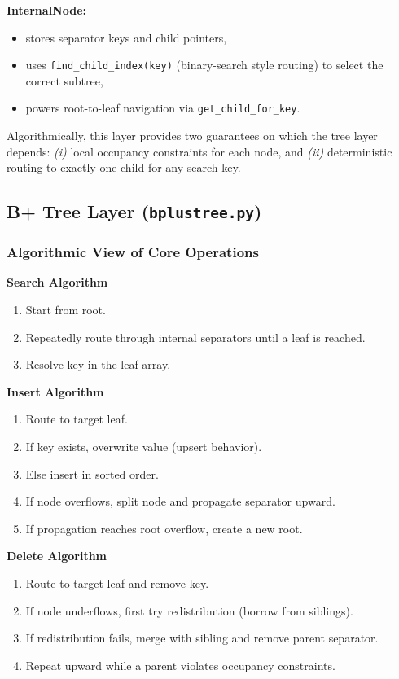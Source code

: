 \documentclass[12pt, a4paper]{article}
\begin{document}
\textbf{InternalNode:}
\begin{itemize}
    \item stores separator keys and child pointers,
    \item uses \texttt{find\_child\_index(key)} (binary-search style routing) to select the correct subtree,
    \item powers root-to-leaf navigation via \texttt{get\_child\_for\_key}.
\end{itemize}

Algorithmically, this layer provides two guarantees on which the tree layer depends: \textit{(i)} local occupancy constraints for each node, and \textit{(ii)} deterministic routing to exactly one child for any search key.

\subsection{B+ Tree Layer (\texttt{bplustree.py})}
\subsubsection{Algorithmic View of Core Operations}
\textbf{Search Algorithm}
\begin{enumerate}
    \item Start from root.
    \item Repeatedly route through internal separators until a leaf is reached.
    \item Resolve key in the leaf array.
\end{enumerate}

\textbf{Insert Algorithm}
\begin{enumerate}
    \item Route to target leaf.
    \item If key exists, overwrite value (upsert behavior).
    \item Else insert in sorted order.
    \item If node overflows, split node and propagate separator upward.
    \item If propagation reaches root overflow, create a new root.
\end{enumerate}

\textbf{Delete Algorithm}
\begin{enumerate}
    \item Route to target leaf and remove key.
    \item If node underflows, first try redistribution (borrow from siblings).
    \item If redistribution fails, merge with sibling and remove parent separator.
    \item Repeat upward while a parent violates occupancy constraints.
\end{enumerate}
\end{document}
